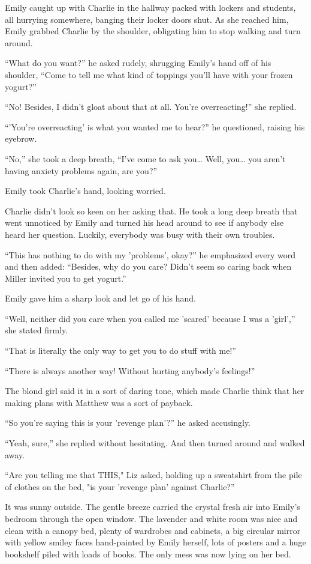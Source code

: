Emily caught up with Charlie in the hallway packed with lockers and students, all hurrying somewhere, banging their locker doors shut. As she reached him, Emily grabbed Charlie by the shoulder, obligating him to stop walking and turn around.

“What do you want?” he asked rudely, shrugging Emily's hand off of his shoulder, “Come to tell me what kind of toppings you'll have with your frozen yogurt?”

“No! Besides, I didn't gloat about that at all. You're overreacting!” she replied.

“'You're overreacting' is what you wanted me to hear?” he questioned, raising his eyebrow.

“No,” she took a deep breath, “I've come to ask you… Well, you… you aren't having anxiety problems again, are you?”

Emily took Charlie's hand, looking worried.

Charlie didn't look so keen on her asking that. He took a long deep breath that went unnoticed by Emily and turned his head around to see if anybody else heard her question. Luckily, everybody was busy with their own troubles.

“This has nothing to do with my 'problems', okay?” he emphasized every word and then added: “Besides, why do you care? Didn't seem so caring back when Miller invited you to get yogurt.”

Emily gave him a sharp look and let go of his hand.

“Well, neither did you care when you called me 'scared' because I was a 'girl',” she stated firmly.

“That is literally the only way to get you to do stuff with me!”

“There is always another way! Without hurting anybody's feelings!”

The blond girl said it in a sort of daring tone, which made Charlie think that her making plans with Matthew was a sort of payback.

“So you're saying this is your 'revenge plan'?” he asked accusingly.

“Yeah, sure,” she replied without hesitating. And then turned around and walked away.

\bigskip

“Are you telling me that THIS," Liz asked, holding up a sweatshirt from the pile of clothes on the bed, "is your 'revenge plan' against Charlie?”

It was sunny outside. The gentle breeze carried the crystal fresh air into Emily's bedroom through the open window. The lavender and white room was nice and clean with a canopy bed, plenty of wardrobes and cabinets, a big circular mirror with yellow smiley faces hand-painted by Emily herself, lots of posters and a huge bookshelf piled with loads of books. The only mess was now lying on her bed.

